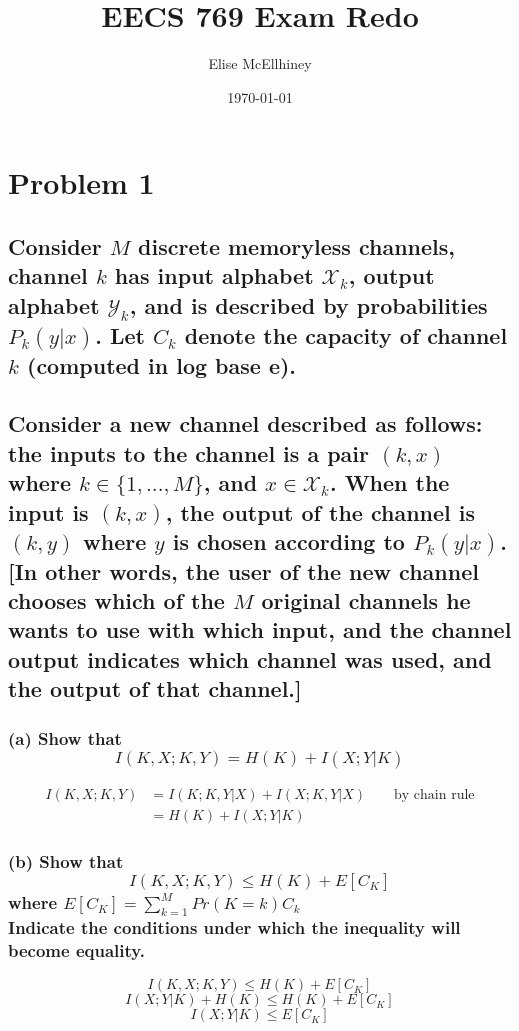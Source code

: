 \documentclass[11pt, oneside]{book}   	%
\title{EECS 769 Exam Redo}
\author{Elise McEllhiney}
\date{\today}							%
\begin{document}
\maketitle

\section{Problem 1}
\subsection*{Consider $M$ discrete memoryless channels, channel $k$ has input alphabet $\mathcal{X}_k$, output alphabet $\mathcal{Y}_k$, and is described by probabilities $P_k(y|x)$.  Let $C_k$ denote the capacity of channel $k$ (computed in log base e).\\\\
Consider a new channel described as follows: the inputs to the channel is a pair $(k,x)$ where $k \in \{1,...,M\}$, and $x \in \mathcal{X}_k$.  When the input is $(k,x)$, the output of the channel is $(k,y)$ where $y$ is chosen according to $P_k(y|x)$. [In other words, the user of the new channel chooses which of the $M$ original channels he wants to use with which input, and the channel output indicates which channel was used, and the output of that channel.]}
\subsubsection{(a) Show that $$I(K,X;K,Y) = H(K) + I(X;Y|K)$$}

\begin{equation}\label{}
    \begin{split}
        I(K,X;K,Y) & = I(K;K,Y|X) + I(X;K,Y|X) \qquad \text{by chain rule} \\
        & = H(K) + I(X;Y|K)
    \end{split}
\end{equation}

\subsubsection{(b) Show that $$I(K,X;K,Y) \leq H(K) + E[C_K]$$ where $E[C_K]=\sum^M_{k=1}Pr(K=k)C_k$ \\
Indicate the conditions under which the inequality will become equality.}

$$I(K,X;K,Y) \leq H(K) + E[C_K]$$
$$I(X;Y|K) + H(K) \leq H(K) + E[C_K]$$
$$I(X;Y|K) \leq E[C_K]$$
\end{document}
